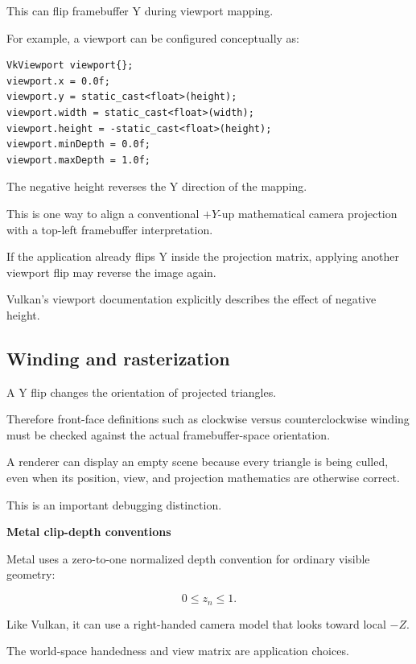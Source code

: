 This can flip framebuffer Y during viewport mapping.

For example, a viewport can be configured conceptually as:

\begin{verbatim}
VkViewport viewport{};
viewport.x = 0.0f;
viewport.y = static_cast<float>(height);
viewport.width = static_cast<float>(width);
viewport.height = -static_cast<float>(height);
viewport.minDepth = 0.0f;
viewport.maxDepth = 1.0f;
\end{verbatim}

The negative height reverses the Y direction of the mapping.

This is one way to align a conventional \(+Y\)-up mathematical camera projection with a top-left framebuffer interpretation.

If the application already flips Y inside the projection matrix, applying another viewport flip may reverse the image again.

Vulkan's viewport documentation explicitly describes the effect of negative height. 

\subsection{Winding and rasterization}\label{02-foundations-ii-ch033-winding-and-rasterization}

\hypertarget{02-foundations-ii-ch033-winding-and-rasterization}{}

A Y flip changes the orientation of projected triangles.

Therefore front-face definitions such as clockwise versus counterclockwise winding must be checked against the actual framebuffer-space orientation.

A renderer can display an empty scene because every triangle is being culled, even when its position, view, and projection mathematics are otherwise correct.

This is an important debugging distinction.

\textbf{Metal clip-depth conventions}

Metal uses a zero-to-one normalized depth convention for ordinary visible geometry:

\[
 \boxed{ 0\le z_n\le1 }.
\]

Like Vulkan, it can use a right-handed camera model that looks toward local \(-Z\).

The world-space handedness and view matrix are application choices.

